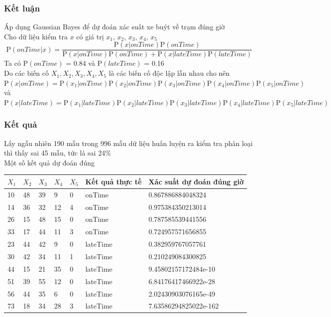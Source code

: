 \documentclass[t]{beamer}
\begin{document}
\begin{frame}
\frametitle{Kết luận}
Áp dụng Gaussian Bayes để dự đoán xác suất xe buýt về trạm đúng giờ\\
Cho dữ liệu kiểm tra $x$ có giá trị $x_1$, $x_2$, $x_3$, $x_4$, $x_5$\\
\[
\mathrm{P}(onTime|x) = \frac{\mathrm{P}(x|onTime)\mathrm{P}(onTime)}{\mathrm{P}(x|onTime)\mathrm{P}(onTime)+\mathrm{P}(x|lateTime)\mathrm{P}(lateTime)}
\]
Ta có $\mathrm{P}(onTime)$ = 0.84 và $\mathrm{P}(lateTime)$ = 0.16\\
Do các biến cố $X_1, X_2, X_3, X_4, X_5$ là các biến cố độc lập lẫn nhau cho nên\\
$\mathrm{P}(x|onTime) = \mathrm{P}(x_1|onTime)\mathrm{P}(x_2|onTime)\mathrm{P}(x_3|onTime)\mathrm{P}(x_4|onTime)\mathrm{P}(x_5|onTime)$ \\
và $\mathrm{P}(x|lateTime) = \mathrm{P}(x_1|lateTime)\mathrm{P}(x_2|lateTime)\mathrm{P}(x_3|lateTime)\mathrm{P}(x_4|lateTime)\mathrm{P}(x_5|lateTime)$
\end{frame}
\begin{frame}
\frametitle{Kết quả}
Lấy ngẫu nhiên 190 mẫu trong 996 mẫu dữ liệu huấn luyện ra kiểm tra phân loại thì thấy sai 45 mẫu, tức là sai 24\%\\
Một số kết quả dự đoán đúng
\begin{flushleft}
\begin{tabular}{|p{0.6cm}|p{0.6cm}|p{0.6cm}|p{0.6cm}|p{0.6cm}|p{1.6cm}|p{5cm}|}
\hline
$X_1$& $X_2$ & $X_3$ & $X_4$ & $X_5$ & Kết quả thực tế & Xác suất dự đoán đúng giờ \\ 
\hline
10 & 48 & 39 & 9 & 0 & onTime & 0.867886884048324\\
\hline
14 & 36 & 32 & 12 & 4 & onTime & 0.975384350213014\\
\hline
26 & 15 & 48 & 15 & 0 & onTime & 0.787585539441556\\
\hline
33 & 17 & 44 & 11 & 3 & onTime & 0.724957571656855\\
\hline
23 & 44 & 42 & 9 & 0 & lateTime & 0.382959767057761\\
\hline
30 & 42 & 34 & 11 & 1 & lateTime & 0.210249084300825\\
\hline
44 & 15 & 21 & 35 & 0 & lateTime & 9.45802157172484e-10\\
\hline
51 & 39 & 55 & 12 & 0 & lateTime & 6.84176417466922e-28\\
\hline
56 & 44 & 35 & 6 & 0 & lateTime & 2.02430903076165e-49\\
\hline
73 & 18 & 34 & 28 & 3 & lateTime & 7.63586294825022e-162\\
\hline
\end{tabular}
\end{flushleft}
\end{frame}
\end{document}

